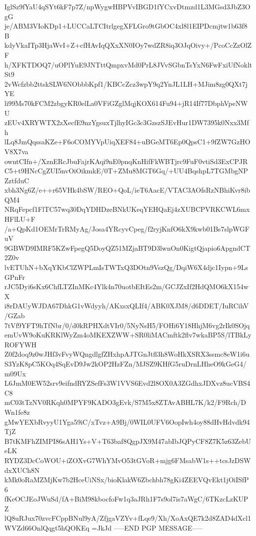 IglSz9fYaU4qSYt6kF7p7Z/npWygwHBPVvIBGD1fYCxvDtmzd1L3MGsd3JbZ3OgG
je/ABM3VIoKDp1+LUCCaLTCItrlgegXFLGro9tGbOC4xl8l1EIPDcmjtw1b63f8B
kdyVkaITp3HjaWvI+Z+cfHAvIqQXxXN0IOy7wdZR8iq3OJqOivy+/PcoCcZzOlZF
h/XFKTDOQ7/uOPlYuE9JNTttQmpxvMd0PrL8JVvSGbnTsYxN6FwFxiUfNokltSt9
2vWcfzbb2ttskSLW6NObbbKpf1/KBCcZcz3wpY9q2YnJL1LH+MJim8zg0QXt7jYE
li99Ms70kFCM2zbgyKR0elLa0VFiGZglMqjKOX614Fu94+jR14If77DbphVpeNWU
zEUv4XRYWTX2zXecfE9nzYgsuxTjlhyIGc3c3GzszSJEvHur1DW7395k0Nxx3Mfh
lLq8JmQqssaKZe+F6oCOMYVpUiqXEF84+uBGeMT6Ep0QpsC1+9fZW7GzHOV8X7va
owntCIfn+/XznERcJbuFajrKAqi9nE0pnqKnHifFkWBTjrc9FuF0vtiSd3ExCPJR
C5+t9HNcCgZUI5nvOiOikmkE/0T+ZMu8MGT6Gq/+UU4BqshpL7TGMbgNPZztfduC
xbh3Ng6Z/e++r65VHk4bSW/REO+QoL/ieT6AacE/VTAC3AOfsRzNBhiKvr8ibQM4
NRqFepcf1FlTC57wq30DqYDHDzeBNkUKeqYEHQaEj4zXUBCPVRKCWL6mxHFlLU+F
/a+QpKd1OEMrTrRMyAg/Josa4YRcyvCpeg/f2ryjKnfO6kX9kwb01Bs7slpWGFuV
9GBWD9IMRF5KZwFpegQ5DoyQZ51MZjaBT9D3lwnOn0KigtQjapio6ApgndCT2Z0v
lvETUhN+bXqYKbClZWPLmIsTWTxQ3DOtn9VszQg/DqiW6X4djc1Iypn+9LsGPnFr
rJC5Dyi6sKx6ChfLTZInMKc4Ylk4n70uotbEItEs2m/GCJZxIf2HdQMO6kX154wX
i8rDAUyWJDA67DhkG1vWdyyh/AKxsxQLIf4/ABK0XJM8/d6DDET/IuRCihV/GZab
7tVf9YFT9hTfNbr/0/d0kRPHXdtVIr0/5NyNsH5/FOHi6Y18HhjM6vg2rIk0SOjq
emUvW9oKuKRKlWyZm4oMKEXZWW+SR0liMACmftk2flv7wkaBP5S/lTBkLyROFYWH
Z0f2doq9z0wJHf3vFvyWQngdlgfZHxhpAJTGnJtfl3h8WoHkXSRX3ssmc8eW1i6u
S3YzK8pC5KOq4SqEvD9Jw2kOP2HzFZn/MJSZ9KHfG5ruDrnLHheO9kGeG4/m09Ux
L6JmM0EW52srv9eifndRYZSefFs3W1VVS6Evd2l8OX0A3ZGdhxJDXvz8ucVBS4C8
mC03tTzNV0RKqh0MPYF9KADO3gEvk/S7M5x8ZTAvABHL7K/k2/F9Rch/DWn1fe8z
gMwYEXbRvyyU1Yga59iC/xTvz+A9Bj/0WIL0UFV6OopIwh4oy88dHvHdvdk94TjZ
B7tKMFhZIMPI86sAH1Ys+V+T63baf8QgpJX9M47abIbJQPyCF8Z7K5z63ZebUeLK
RYDZ3DcCoWOU+iZOXvG7WhYMvO53tGVoR+mjg6FMsabW1s++tcsJzDSWdxXUCh8N
kMk0oRaMZMjKw7b2HceUiNSx/bioKlakW6Zbchbh78gKi4ZEEVQvEkt1jOiISfP6
fKeOCJEoJWuSd/fA+BiM98kbocfoFw1q3aJRh1F7s9ol7is7aWgC/6TKzcLzKUPZ
lQ8uRJux70zvcFCppBNul9yA/ZfjgaVZYv+fLqe9/Xh/XoAxQE7k2d8ZAD4dXcl1
WVZd66OnlQqgt5hQOKEq
=JkJd
-----END PGP MESSAGE-----
